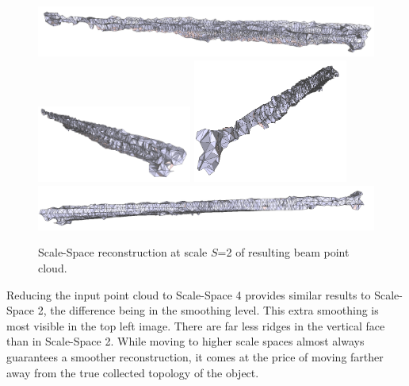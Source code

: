 \documentclass[12pt]{drexelthesis}
\begin{document}
\begin{figure}[!ht]
	\centering
		\includegraphics[width=5in]{real-lab-scans/meshedNeat/scalespace200.png}
		\includegraphics[width=2in]{real-lab-scans/meshedNeat/scalespace201.png}
		\includegraphics[width=2in]{real-lab-scans/meshedNeat/scalespace202.png}
		\includegraphics[width=5in]{real-lab-scans/meshedNeat/scalespace203.png}
		\caption[Scale-Space reconstruction at scale $S$=2 of segmented LiDAR data]{\centering Scale-Space reconstruction at scale $S$=2 of resulting beam point cloud.}
	\label{lidar:scalespace2}
\end{figure}

Reducing the input point cloud to Scale-Space 4 provides similar results to Scale-Space 2, the difference being in the smoothing level. This extra smoothing is most visible in the top left image. There are far less ridges in the vertical face than in Scale-Space 2. While moving to higher scale spaces almost always guarantees a smoother reconstruction, it comes at the price of moving farther away from the true collected topology of the object.
\end{document}

